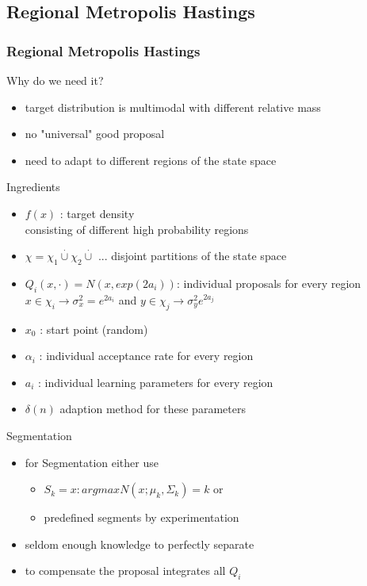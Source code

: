 
\subsection{Regional Metropolis Hastings}
\begin{frame}
\frametitle{Regional Metropolis Hastings}
\begin{block}{Why do we need it?}
\begin{itemize}
\item target distribution is multimodal with different relative mass
\item no "universal" good proposal
\item need to adapt to different regions of the state space
\end{itemize}
\end{block}
\end{frame}

\begin{frame}
\begin{block}{Ingredients}
\begin{itemize}
\item $f(x)$ : target density\\
consisting of different high probability regions
\item $\chi = \chi_1 \stackrel{\cdot}{\cup} \chi_2 \stackrel{\cdot}{\cup}$ ... disjoint partitions of the state space 
\item $Q_i(x,\cdot) = N(x, exp(2a_i))$: individual proposals for every region\\
$x \in \chi_i \rightarrow \sigma^2_x = e^{2a_i}$ and $y \in \chi_j \rightarrow \sigma^2_y e^{2a_j}$
\item $x_0$ : start point (random)
\item $\alpha_i$ : individual acceptance rate for every region
\item $a_i$ : individual learning parameters for every region
\item $\delta(n)$ adaption method for these parameters

\end{itemize}
\end{block}
\end{frame}

\begin{frame}
\begin{block}{Segmentation}
\begin{itemize}
\item for Segmentation either use
\begin{itemize}
\item $S_k = {x: argmax N(x;\mu_k,\Sigma_k) = k}$ 
or
\item predefined segments by experimentation\\
\end{itemize}
\item seldom enough knowledge to perfectly separate\\

\item to compensate the proposal integrates all $Q_i$
\end{itemize}
\end{block}

\end{frame}

